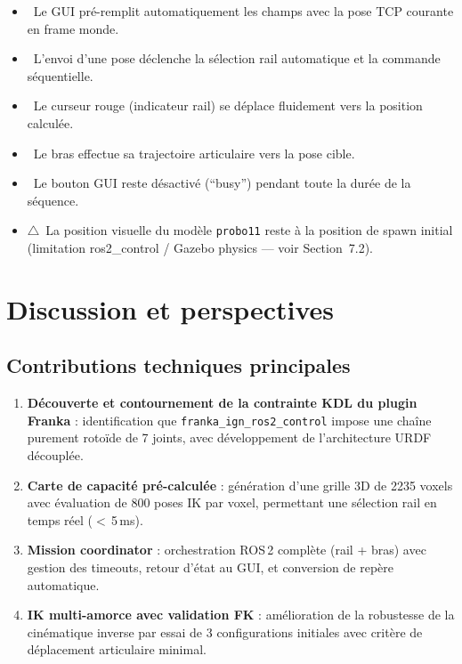 \documentclass[11pt, a4paper]{article}
\begin{document}
\begin{itemize}[leftmargin=1.5em, itemsep=4pt]
  \item \checkmark\ Le GUI pré-remplit automatiquement les champs avec la pose TCP courante en frame monde.
  \item \checkmark\ L'envoi d'une pose déclenche la sélection rail automatique et la commande séquentielle.
  \item \checkmark\ Le curseur rouge (indicateur rail) se déplace fluidement vers la position calculée.
  \item \checkmark\ Le bras effectue sa trajectoire articulaire vers la pose cible.
  \item \checkmark\ Le bouton GUI reste désactivé (``busy'') pendant toute la durée de la séquence.
  \item $\triangle$\ La position visuelle du modèle \texttt{probo11} reste à la position de spawn initial (limitation ros2\_control / Gazebo physics — voir Section~7.2).
\end{itemize}

\section{Discussion et perspectives}

\subsection{Contributions techniques principales}

\begin{enumerate}[leftmargin=2em, itemsep=6pt]
  \item \textbf{Découverte et contournement de la contrainte KDL du plugin Franka} : identification que \texttt{franka\_ign\_ros2\_control} impose une chaîne purement rotoïde de 7 joints, avec développement de l'architecture URDF découplée.

  \item \textbf{Carte de capacité pré-calculée} : génération d'une grille 3D de 2235 voxels avec évaluation de 800 poses IK par voxel, permettant une sélection rail en temps réel ($<$\,5\,ms).

  \item \textbf{Mission coordinator} : orchestration ROS\,2 complète (rail + bras) avec gestion des timeouts, retour d'état au GUI, et conversion de repère automatique.

  \item \textbf{IK multi-amorce avec validation FK} : amélioration de la robustesse de la cinématique inverse par essai de 3 configurations initiales avec critère de déplacement articulaire minimal.
\end{enumerate}
\end{document}
